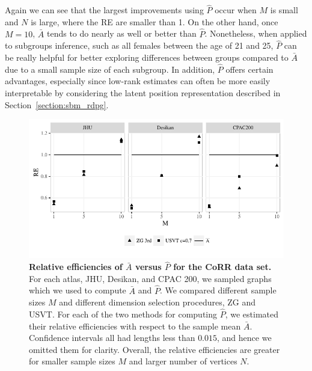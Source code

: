 \documentclass[10pt,letterpaper]{article}
\renewcommand{\hat}{\widehat}
\begin{document}
Again we can see that the largest improvements using $\hat{P}$ occur when $M$ is small and $N$ is large, where the RE are smaller than 1.
On the other hand, once $M=10$, $\bar{A}$ tends to do nearly as well or better than $\hat{P}$. 
Nonetheless, when applied to subgroups inference, such as all females between the age of 21 and 25, $\hat{P}$ can be really helpful for better exploring differences between groups compared to $\bar{A}$ due to a small sample size of each subgroup.
In addition, $\hat{P}$ offers certain advantages, especially since low-rank estimates can often be more easily interpretable by considering the latent position representation described in Section~\ref{section:sbm_rdpg}.

\begin{figure}
\begin{center}
  \includegraphics[width=1\linewidth]{corr_data_REdiff.pdf}
\end{center}
\caption{{\bf Relative efficiencies of $\bar{A}$ versus $\hat{P}$ for the CoRR data set.}
For each atlas, JHU, Desikan, and CPAC 200, we sampled graphs which we used to compute $\bar{A}$ and $\hat{P}$.
We compared different sample sizes $M$ and different dimension selection procedures, ZG and USVT.
For each of the two methods for computing $\hat{P}$, we estimated their relative efficiencies with respect to the sample mean $\bar{A}$.
Confidence intervals all had lengths less than $0.015$, and hence we omitted them for clarity.
Overall, the relative efficiencies are greater for smaller sample sizes $M$ and larger number of vertices $N$.} 
\label{fig:corr_re}
\end{figure}
\end{document}
